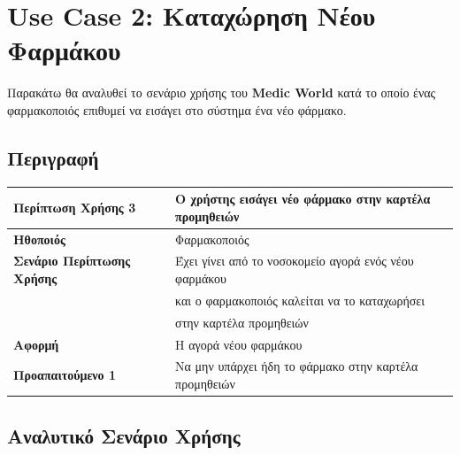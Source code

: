 \documentclass{article}
\newcommand\T{\rule{0pt}{2.6ex}}       %
\newcommand\B{\rule[-1.2ex]{0pt}{0pt}}
\begin{document}
\section{Use Case 2: Καταχώρηση Νέου Φαρμάκου }
 
 Παρακάτω θα αναλυθεί το σενάριο χρήσης του \textbf{Medic World} κατά το οποίο ένας φαρμακοποιός επιθυμεί να εισάγει στο σύστημα ένα νέο φάρμακο.
 
\subsection{Περιγραφή}

\begin{center}
     \begin{tabular}{|l|l|}
     \hline
      \textbf{Περίπτωση Χρήσης 3} & Ο χρήστης εισάγει νέο φάρμακο στην καρτέλα προμηθειών \T\B \\ 
      \hline
      \textbf{Ηθοποιός} & Φαρμακοποιός \T\B \\
      \hline
      \textbf{Σενάριο Περίπτωσης Χρήσης} & Έχει γίνει από το νοσοκομείο αγορά ενός νέου φαρμάκου \T \\& και ο φαρμακοποιός καλείται να το καταχωρήσει \\& στην καρτέλα προμηθειών \B \\
      \hline
      \textbf{Αφορμή} & Η αγορά νέου φαρμάκου \T\B \\
      \hline
      \textbf{Προαπαιτούμενο 1} &  Να μην υπάρχει ήδη το φάρμακο στην καρτέλα προμηθειών \T\B \\
      \hline
     \end{tabular}
 \end{center}
 
  \subsection{Αναλυτικό Σενάριο Χρήσης}
 
\end{document}
